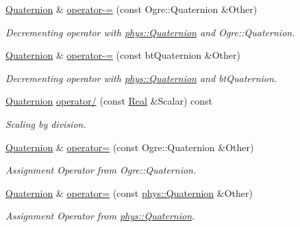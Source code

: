 \begin{DoxyCompactItemize}
\hyperlink{classphys_1_1Quaternion}{Quaternion} \& \hyperlink{classphys_1_1Quaternion_af62037687eea0005c9fc4a09355656ed}{operator-\/=} (const Ogre::Quaternion \&Other)
\begin{DoxyCompactList}\small\item\em Decrementing operator with \hyperlink{classphys_1_1Quaternion}{phys::Quaternion} and Ogre::Quaternion. \item\end{DoxyCompactList}\item 
\hyperlink{classphys_1_1Quaternion}{Quaternion} \& \hyperlink{classphys_1_1Quaternion_abd1e9d740b3af194c60466105d07f6ff}{operator-\/=} (const btQuaternion \&Other)
\begin{DoxyCompactList}\small\item\em Decrementing operator with \hyperlink{classphys_1_1Quaternion}{phys::Quaternion} and btQuaternion. \item\end{DoxyCompactList}\item 
\hyperlink{classphys_1_1Quaternion}{Quaternion} \hyperlink{classphys_1_1Quaternion_a9b9492e5a14178aedc784e93b0153364}{operator/} (const \hyperlink{namespacephys_af7eb897198d265b8e868f45240230d5f}{Real} \&Scalar) const 
\begin{DoxyCompactList}\small\item\em Scaling by division. \item\end{DoxyCompactList}\item 
\hyperlink{classphys_1_1Quaternion}{Quaternion} \& \hyperlink{classphys_1_1Quaternion_a6b9fe92548e3fd114d7419ddd5d5a660}{operator=} (const Ogre::Quaternion \&Other)
\begin{DoxyCompactList}\small\item\em Assignment Operator from Ogre::Quaternion. \item\end{DoxyCompactList}\item 
\hyperlink{classphys_1_1Quaternion}{Quaternion} \& \hyperlink{classphys_1_1Quaternion_a6213bddf8f928a8510260b9deb712fd7}{operator=} (const \hyperlink{classphys_1_1Quaternion}{phys::Quaternion} \&Other)
\begin{DoxyCompactList}\small\item\em Assignment Operator from \hyperlink{classphys_1_1Quaternion}{phys::Quaternion}. \item\end{DoxyCompactList}\item 

\end{DoxyCompactItemize}
